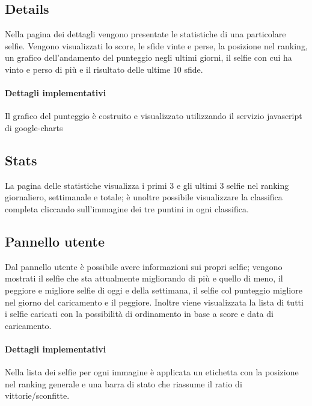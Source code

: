 \documentclass{article}
\begin{document}
\subsection{Details}
Nella pagina dei dettagli vengono presentate le statistiche di una particolare selfie. Vengono visualizzati lo score, le sfide vinte e perse, la posizione nel ranking, un grafico dell'andamento del punteggio negli ultimi giorni, il selfie con cui ha vinto e perso di più e il risultato delle ultime 10 sfide.

\paragraph*{Dettagli implementativi}
Il grafico del punteggio è costruito e visualizzato utilizzando il servizio javascript di google-charts

\subsection{Stats}
La pagina delle statistiche visualizza i primi 3 e gli ultimi 3 selfie nel ranking giornaliero, settimanale e totale; è unoltre possibile visualizzare la classifica completa cliccando sull'immagine dei tre puntini in ogni classifica.

\subsection{Pannello utente}
Dal pannello utente è possibile avere informazioni sui propri selfie; vengono mostrati il selfie che sta attualmente migliorando di più e quello di meno, il peggiore e migliore selfie di oggi e della settimana, il selfie col punteggio migliore nel giorno del caricamento e il peggiore. Inoltre viene visualizzata la lista di tutti i selfie caricati con la possibilità di ordinamento in base a score e data di caricamento.

\paragraph*{Dettagli implementativi}
Nella lista dei selfie per ogni immagine è applicata un etichetta con la posizione nel ranking generale e una barra di stato che riassume il ratio di vittorie/sconfitte.
\end{document}
